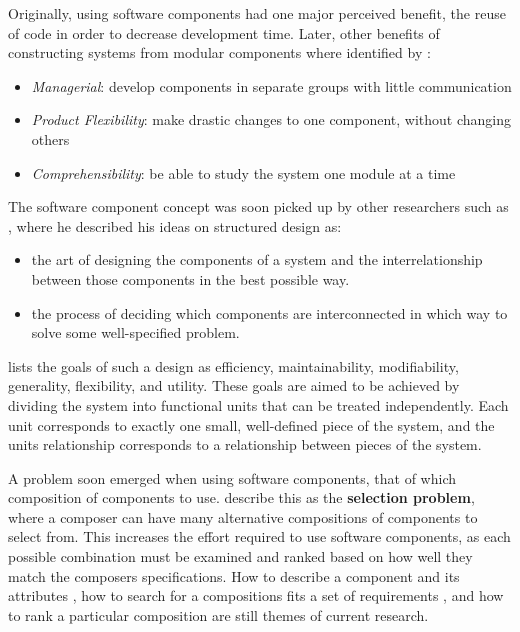 Originally, using software components had one major perceived benefit, the reuse of code in order to decrease development time.
Later, other benefits of constructing systems from modular components where identified by \cite{Parnas1972}:
\begin{itemize}
  \item \textit{Managerial}: develop components in separate groups with little communication
  \item \textit{Product Flexibility}: make drastic changes to one component, without changing others
  \item \textit{Comprehensibility}: be able to study the system one module at a time
\end{itemize}

The software component concept was soon picked up by other researchers such as \cite{Yourdon1976}, where he described his ideas on structured design as:
\begin{itemize}
  \item the art of designing the components of a system and the interrelationship between those components in the best possible way.
  \item the process of deciding which components are interconnected in which way to solve some well-specified problem.
\end{itemize}
\cite{Yourdon1976} lists the goals of such a design as efficiency, maintainability, modifiability, generality, flexibility, and utility.
These goals are aimed to be achieved by dividing the system into functional units that can be treated independently.
Each unit corresponds to exactly one small, well-defined piece of the system, and the units relationship corresponds to a relationship between pieces of the system.

A problem soon emerged when using software components, that of which composition of components to use.
\cite{PrietoDiaz1987} describe this as the \textbf{selection problem}, where a composer can have many alternative compositions of components to select from.
This increases the effort required to use software components, as each possible combination must be examined and ranked based on how well they match the composers specifications.
How to describe a component and its attributes \citep{treinen2009common,Xinjuan2007},
how to search for a compositions fits a set of requirements \citep{abate2011,Kwong2010,treinen2009,DeAlmeida2004}, 
and how to rank a particular composition \citep{Chen2011,Aleti2009} are still themes of current research.

